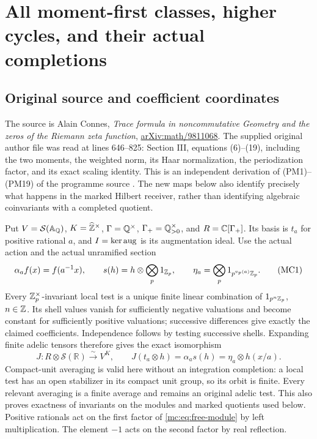 \section{All moment-first classes, higher cycles, and their actual completions}


\subsection{Original source and coefficient coordinates}

The source is Alain Connes, \emph{Trace formula in noncommutative
Geometry and the zeros of the Riemann zeta function},
\href{https://arxiv.org/abs/math/9811068}{arXiv:math/9811068}.
The supplied original author file  was
read at lines 646--825: Section III, equations (6)--(19), including
the two moments, the weighted norm, its Haar normalization, the
periodization factor, and its exact scaling identity. This is an
independent derivation of (PM1)--(PM19) of the programme source
.
The new maps below also identify precisely what happens in the
marked Hilbert receiver, rather than identifying algebraic
coinvariants with a completed quotient.

Put $V=\mathcal S(\mathbb A_\mathbb Q)$, $K=\widehat{\mathbb Z}^{\times}$,
$\Gamma=\mathbb Q^{\times}$, $\Gamma_+=\mathbb Q_{>0}^{\times}$, and
$R=\mathbb C[\Gamma_+]$. Its basis is $t_a$ for positive rational $a$,
and $I=\ker\operatorname{aug}$ is its augmentation ideal. Use the actual action
and the actual unramified section
\[
 \alpha_af(x)=f(a^{-1}x),\qquad
 s(h)=h\otimes\bigotimes_p1_{\mathbb Z_p},\qquad
 \eta_a=\bigotimes_p1_{p^{v_p(a)}\mathbb Z_p}.
 \tag{MC1}\label{mc:eq:coordinates}
\]
Every $\mathbb Z_p^{\times}$-invariant local test is a unique finite
linear combination of $1_{p^n\mathbb Z_p}$, $n\in\mathbb Z$. Its shell values
vanish for sufficiently negative valuations and become constant
for sufficiently positive valuations; successive differences give
exactly the claimed coefficients. Independence follows by testing
successive shells. Expanding finite adelic tensors therefore gives
the exact isomorphism
\[
 J:R\otimes\mathcal S(\mathbb R)\xrightarrow{\sim}V^K,
 \qquad J(t_a\otimes h)=\alpha_as(h)
       =\eta_a\otimes h(x/a).
 \tag{MC2}\label{mc:eq:free-module}
\]
Compact-unit averaging is valid here without an integration
completion: a local test has an open stabilizer in its compact
unit group, so its orbit is finite. Every relevant averaging is
a finite average and remains an original adelic test. This also
proves exactness of invariants on the modules and marked quotients
used below. Positive rationals act on the first factor of
\eqref{mc:eq:free-module} by left multiplication. The element $-1$
acts on the second factor by real reflection.

